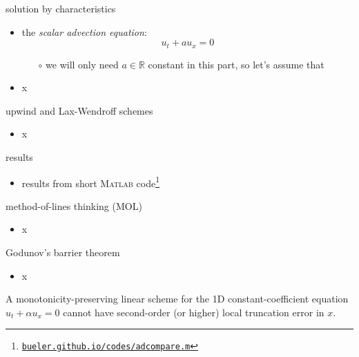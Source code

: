 \documentclass[10pt,hyperref]{beamer}
\newcommand{\RR}{\mathbb{R}}
\newcommand{\Matlab}{\textsc{Matlab}\xspace}
\begin{document}
\begin{frame}{solution by characteristics}

\begin{itemize}
\item the \emph{scalar advection equation}:
    $$u_t + a u_x=0$$
    \begin{itemize}
    \item[$\circ$] we will only need $a\in\RR$ constant in this part, so let's assume that
    \end{itemize}
\item x
\end{itemize}
\end{frame}


\begin{frame}{upwind and Lax-Wendroff schemes}

\begin{itemize}
\item x
\end{itemize}
\end{frame}


\begin{frame}{results}

\begin{itemize}
\item results from short \Matlab code\footnote{\href{http://bueler.github.io/codes/adcompare.m}{\texttt{bueler.github.io/codes/adcompare.m}}}
\end{itemize}
\end{frame}


\begin{frame}{method-of-lines thinking (MOL)}

\begin{itemize}
\item x
\end{itemize}
\end{frame}


\begin{frame}{Godunov's barrier theorem}

\begin{itemize}
\item x
\end{itemize}

\begin{theorem}  A monotonicity-preserving linear scheme for the 1D constant-coefficient equation $u_t + \alpha u_x=0$ cannot have second-order (or higher) local truncation error in $x$.\end{theorem}
\end{frame}
\end{document}
